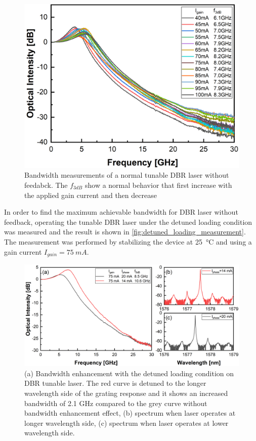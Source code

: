 \begin{figure}[ht]
    \centering
    \includegraphics[width=0.7\linewidth]{figures/bandwidth_gain_scan_cleaved_4679.png}
    \caption{Bandwidth measurements of a normal tunable DBR laser without feedabck. The $f_{3dB}$ show a normal behavior that first increase with the applied gain current and then decrease}
    \label{fig:bandwidth_gain_scan_cleaved_4679}
\end{figure}

In order to find the maximum achievable bandwidth for DBR laser without feedback, operating the tunable DBR laser under the detuned loading condition was measured and the result is shown in \autoref{fig:detuned_loading_measurement}. The measurement was performed by stabilizing the device at \SI{25}{\celsius} and using a gain current $I_{gain}=75 \ mA$. 


\begin{figure}[H]
    \centering
    \includegraphics[width=\linewidth]{figures/detuned_loading.png}
    \caption{(a) Bandwidth enhancement with the detuned loading condition on DBR tunable laser. The red curve is detuned to the longer wavelength side of the grating response and it shows an increased bandwidth of 2.1 GHz compared to the grey curve without bandwidth enhancement effect, (b) spectrum when laser operates at longer wavelength side, (c) spectrum when laser operates at lower wavelength side.}
    \label{fig:detuned_loading_measurement}
\end{figure}

